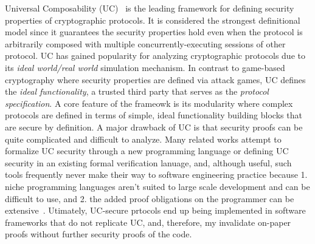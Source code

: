 Universal Composability (UC)~\cite{canettiUC} is the leading framework for defining security properties of cryptographic protocols.
It is considered the strongest definitional model since it guarantees the security properties hold even when the protocol is arbitrarily composed with
multiple concurrently-executing sessions of other protocol.
UC has gained popularity for analyzing cryptographic protocols due to its \emph{ideal world/real world} simulation mechanism.
In contrast to game-based cryptography where security properties are defined via attack games,
UC defines the \emph{ideal functionality}, a trusted third party that serves as the \emph{protocol specification}.
A core feature of the frameowk is its modularity where complex protocols are defined in terms of simple, ideal functionality building blocks that are secure by definition. 
A major drawback of UC is that security proofs can be quite complicated and difficult to analyze. 
Many related works \cite{ilc, easyuc, ipdl, etc} attempt to formalize UC security through a new programming language or defining UC security in an existing formal verification lanuage, and,  
although useful, such tools frequently never make their way to software engineering practice because
1. niche programming languages aren't suited to large scale development and can be difficult to use, and 2. the added proof obligations on the programmer can be extensive~\cite{ironfleet}.
Utimately, UC-secure prtocols end up being implemented in software frameworks that do not replicate UC, and, therefore, my invalidate on-paper proofs without further security proofs of the code.

